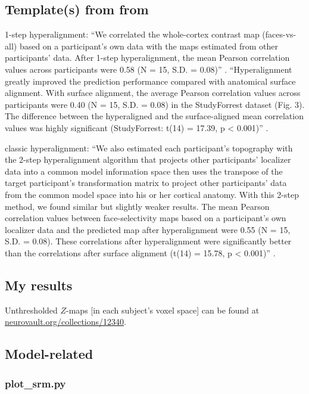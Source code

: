 \subsection{Template(s) from from \citet{jiahui2020predicting}}

1-step hyperalignment: ``We correlated the whole-cortex contrast map
(faces-vs-all) based on a participant's own data with the maps estimated from
other participants' data.  After 1-step hyperalignment, the mean Pearson
correlation values across participants were 0.58 (N = 15, S.D. = 0.08)''
\citep{jiahui2020predicting}.
%
``Hyperalignment greatly improved the prediction performance compared with
anatomical surface alignment. With surface alignment, the average Pearson
correlation values across participants were 0.40 (N = 15, S.D. = 0.08) in the
StudyForrest dataset (Fig. 3). The difference between the hyperaligned and the
surface-aligned mean correlation values was highly significant (StudyForrest:
t(14) = 17.39, p < 0.001)'' \citep{jiahui2020predicting}.

%
classic hyperalignment: ``We also estimated each participant's topography with
the 2-step hyperalignment algorithm that projects other participants' localizer
data into a common model information space then uses the transpose of the target
participant's transformation matrix to project other participants' data from the
common model space into his or her cortical anatomy. With this 2-step method, we
found similar but slightly weaker results. The mean Pearson correlation values
between face-selectivity maps based on a participant's own localizer data and
the predicted map after hyperalignment were 0.55 (N = 15, S.D. = 0.08).  These
correlations after hyperalignment were significantly better than the
correlations after surface alignment (t(14) = 15.78, p < 0.001)''
\citep{jiahui2020predicting}.


\subsection{My results}

Unthresholded $Z$-maps [in each subject's voxel space] can be found at
\href{https://identifiers.org/neurovault.collection:12340}{\url{neurovault.org/collections/12340}}.


\subsection{Model-related}

\subsubsection{plot\_srm.py}

